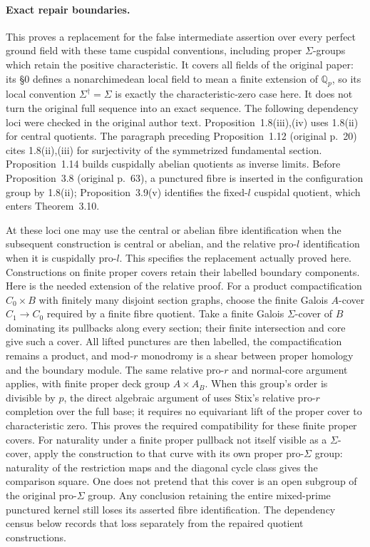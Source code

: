\paragraph{Exact repair boundaries.}
This proves a replacement for the false intermediate assertion over
every perfect ground field with these tame cuspidal conventions,
including proper $\Sigma$-groups which retain the positive
characteristic. It covers all fields of the original paper:
its \S0 defines a nonarchimedean local field to mean a finite
extension of $\mathbb Q_p$, so its local convention
$\Sigma^\dagger=\Sigma$ is exactly the characteristic-zero
case here. It does not turn the original
full sequence into an exact sequence. The following dependency loci were
checked in the original author text. Proposition~1.8(iii),(iv) uses
1.8(ii) for central quotients. The paragraph preceding Proposition~1.12
(original p.~20) cites 1.8(ii),(iii) for surjectivity of the symmetrized
fundamental section. Proposition~1.14 builds cuspidally abelian quotients
as inverse limits. Before Proposition~3.8 (original p.~63), a punctured
fibre is inserted in the configuration group by 1.8(ii); Proposition~3.9(v)
identifies the fixed-$l$ cuspidal quotient, which enters Theorem~3.10.

At these loci one may use the central or abelian fibre identification
when the subsequent construction is central or abelian, and the relative
pro-$l$ identification when it is cuspidally pro-$l$. This specifies the
replacement actually proved here. Constructions on finite proper covers
retain their labelled boundary components. Here is the needed extension
of the relative proof. For a product compactification $C_0\times B$
with finitely many disjoint section graphs, choose the finite Galois
$A$-cover $C_1\to C_0$ required by a finite fibre quotient. Take a
finite Galois $\Sigma$-cover of $B$ dominating its pullbacks along
every section; their finite intersection and core give such a cover.
All lifted punctures are then labelled, the compactification remains
a product, and mod-$r$ monodromy is a shear between proper homology
and the boundary module. The same relative pro-$r$ and normal-core
argument applies, with finite proper deck group $A\times A_B$.
When this group's order is divisible by $p$, the direct algebraic
argument of  uses Stix's relative pro-$r$
completion over the full base; it requires no equivariant lift of the
proper cover to characteristic zero.
This proves the required compatibility for these finite proper covers.
For naturality under a finite proper pullback not itself visible
as a $\Sigma$-cover, apply the construction to that curve with
its own proper pro-$\Sigma$ group: naturality of the restriction
maps and the diagonal cycle class gives the comparison square.
One does not pretend that this cover is an open subgroup of the
original pro-$\Sigma$ group. Any conclusion retaining the entire
mixed-prime punctured kernel still loses its asserted fibre
identification. The dependency census below records that loss
separately from the repaired quotient constructions.
\citep[Propositions~1.8,1.12,1.14,3.9 and Theorem~3.10]{LA_Mochizuki2007}

